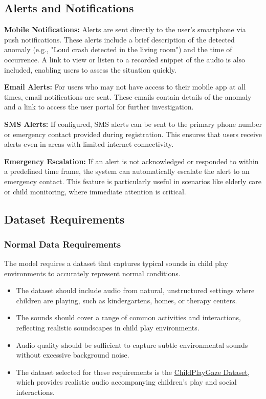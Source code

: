 \documentclass[conference]{IEEEtran}
\begin{document}
\subsection{Alerts and Notifications}
\textbf{Mobile Notifications:} Alerts are sent directly to the user’s smartphone via push notifications. These alerts include a brief description of the detected anomaly (e.g., "Loud crash detected in the living room") and the time of occurrence. A link to view or listen to a recorded snippet of the audio is also included, enabling users to assess the situation quickly.

\textbf{Email Alerts:} For users who may not have access to their mobile app at all times, email notifications are sent. These emails contain details of the anomaly and a link to access the user portal for further investigation.

\textbf{SMS Alerts:} If configured, SMS alerts can be sent to the primary phone number or emergency contact provided during registration. This ensures that users receive alerts even in areas with limited internet connectivity.

\textbf{Emergency Escalation:} If an alert is not acknowledged or responded to within a predefined time frame, the system can automatically escalate the alert to an emergency contact. This feature is particularly useful in scenarios like elderly care or child monitoring, where immediate attention is critical.

\subsection{Dataset Requirements}
\subsubsection{Normal Data Requirements}
The model requires a dataset that captures typical sounds in child play environments to accurately represent normal conditions.

\begin{itemize}
    \item The dataset should include audio from natural, unstructured settings where children are playing, such as kindergartens, homes, or therapy centers.
    \item The sounds should cover a range of common activities and interactions, reflecting realistic soundscapes in child play environments.
    \item Audio quality should be sufficient to capture subtle environmental sounds without excessive background noise.
    \item The dataset selected for these requirements is the \href{https://www.idiap.ch/en/dataset/childplay-gaze}{ChildPlayGaze Dataset}, which provides realistic audio accompanying children’s play and social interactions.
\end{itemize}
\end{document}
